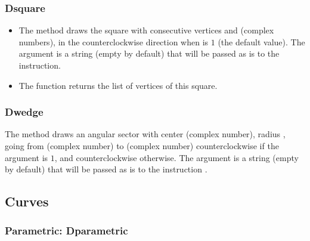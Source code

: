 \subsubsection{Dsquare}
\begin{itemize}
    \item The  method draws the square with consecutive vertices  and  (complex numbers), in the counterclockwise direction when  is $1$ (the default value). The argument  is a string (empty by default) that will be passed as is to the \drawcmd instruction.
    \item The  function returns the list of vertices of this square.
\end{itemize}

\subsubsection{Dwedge}
The method  draws an angular sector with center  (complex number), radius , going from  (complex number) to  (complex number) counterclockwise if the argument  is $1$, and counterclockwise otherwise. The argument  is a string (empty by default) that will be passed as is to the instruction \drawcmd.

\subsection{Curves}

\subsubsection{Parametric: Dparametric}

